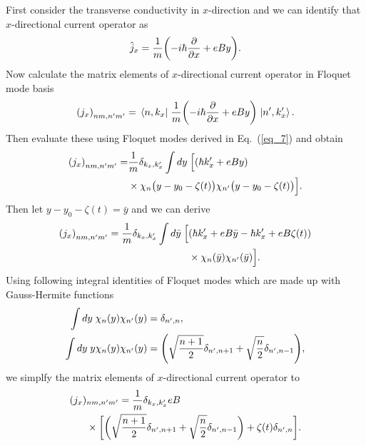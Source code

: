 First consider the transverse conductivity in $x$-direction and we can identify that $x$-directional current operator as
\begin{equation} \label{eq_d4}
  \hat{j}_x = \frac{1}{m} \qty(-i\hbar\pdv{x} + eBy).
\end{equation}
Now calculate the matrix elements of $x$-directional current operator in Floquet mode basis
\begin{equation} \label{eq_d5}
  \qty({j}_x)_{nm,n'm'} =
  \mel{n,k_x}{\;\frac{1}{m} \qty(-i\hbar\pdv{x} + eBy)\;}{n',k'_x}.
\end{equation}
Then evaluate these using Floquet modes derived in Eq.~(\ref{eq_7}) and obtain
\begin{equation} \label{eq_d6}
  \begin{aligned}
    \qty({j}_x)_{nm,n'm'} = &
    \frac{1}{{m}}
    \delta_{k_x,k'_x}
    \int dy \;
    \Big[
    \qty(\hbar k'_x + eBy) \\
    & \times
     \chi_{n}\big(y - y_0 - \zeta(t)\big)
    \chi_{n'}\big(y - y_0 - \zeta(t)\big)
    \Big].
  \end{aligned}
\end{equation}
Then let $y - y_0 - \zeta(t) = \bar{y}$ and we can derive
\begin{equation} \label{eq_d7}
  \begin{aligned}
    \qty({j}_x)_{nm,n'm'} =
    \frac{1}{{m}}
    \delta_{k_x,k'_x}
    \int d\bar{y} \;
    \Big[ &
    \qty(\hbar k'_x + eB\bar{y} -\hbar k'_x + eB\zeta(t)) \\
    & \times
    \chi_{n}(\bar{y})
    \chi_{n'}(\bar{y})
    \Big].
  \end{aligned}
\end{equation}
Using following integral identities of Floquet modes which are made up with  Gauss-Hermite functions \cite{vedenyapin11,szego59}
\begin{subequations} \label{eq_d8}
  \begin{align}
    \int d{y} \;
    \chi_{n}({y})
    \chi_{n'}({y}) &=
    \delta_{n',n}, \\
    \int dy \;
    y
    \chi_{n}({y})
    \chi_{n'}({y}) &=
    \qty(\sqrt{\frac{n+1}{2}} \delta_{n',n+1} + \sqrt{\frac{n}{2}}
    \delta_{n',n-1}),
  \end{align}
\end{subequations}
we simplfy the matrix elements of $x$-directional current operator to
\begin{equation} \label{eq_d9}
  \begin{aligned}
    \qty({j}_x)&_{nm,n'm'} =
    \frac{1}{{m}}
    \delta_{k_x,k'_x}
    eB\\
    & \times
    \bigg[
    \bigg(\sqrt{\frac{n+1}{2}} \delta_{n',n+1} + \sqrt{\frac{n}{2}}
    \delta_{n',n-1}\bigg)
    + \zeta(t) \delta_{n',n}
    \bigg].
  \end{aligned}
\end{equation}

